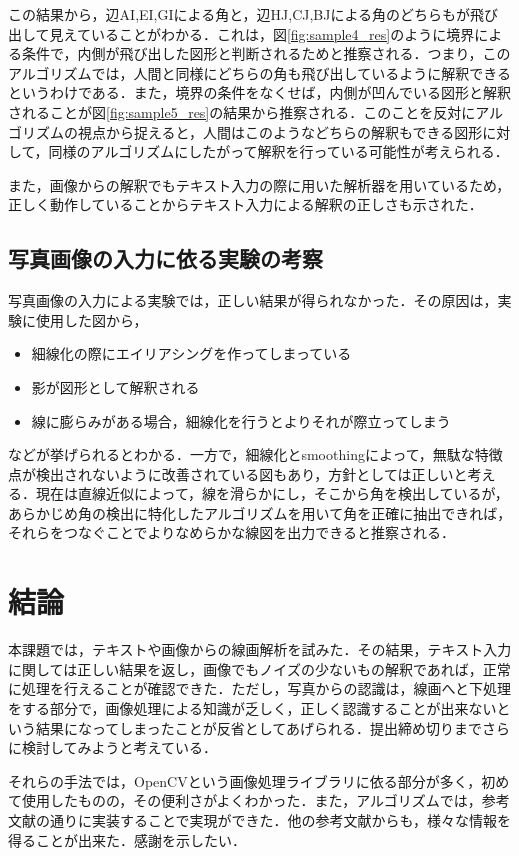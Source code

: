 \documentclass{jarticle}
\begin{document}
この結果から，辺AI,EI,GIによる角と，辺HJ,CJ,BJによる角のどちらもが飛び出して見えていることがわかる．これは，図\ref{fig:sample4_res}のように境界による条件で，内側が飛び出した図形と判断されるためと推察される．つまり，このアルゴリズムでは，人間と同様にどちらの角も飛び出しているように解釈できるというわけである．また，境界の条件をなくせば，内側が凹んでいる図形と解釈されることが図\ref{fig:sample5_res}の結果から推察される．このことを反対にアルゴリズムの視点から捉えると，人間はこのようなどちらの解釈もできる図形に対して，同様のアルゴリズムにしたがって解釈を行っている可能性が考えられる．

また，画像からの解釈でもテキスト入力の際に用いた解析器を用いているため，正しく動作していることからテキスト入力による解釈の正しさも示された．



\subsection{写真画像の入力に依る実験の考察}
写真画像の入力による実験では，正しい結果が得られなかった．その原因は，実験に使用した図から，
\begin{itemize}
	\item 細線化の際にエイリアシングを作ってしまっている
	\item 影が図形として解釈される
	\item 線に膨らみがある場合，細線化を行うとよりそれが際立ってしまう
\end{itemize}
などが挙げられるとわかる．一方で，細線化とsmoothingによって，無駄な特徴点が検出されないように改善されている図もあり，方針としては正しいと考える．現在は直線近似によって，線を滑らかにし，そこから角を検出しているが，あらかじめ角の検出に特化したアルゴリズムを用いて角を正確に抽出できれば，それらをつなぐことでよりなめらかな線図を出力できると推察される．



\section{結論}
本課題では，テキストや画像からの線画解析を試みた．その結果，テキスト入力に関しては正しい結果を返し，画像でもノイズの少ないもの解釈であれば，正常に処理を行えることが確認できた．ただし，写真からの認識は，線画へと下処理をする部分で，画像処理による知識が乏しく，正しく認識することが出来ないという結果になってしまったことが反省としてあげられる．提出締め切りまでさらに検討してみようと考えている．

それらの手法では，OpenCVという画像処理ライブラリに依る部分が多く，初めて使用したものの，その便利さがよくわかった．また，アルゴリズムでは，参考文献\cite{ref:labeling}の通りに実装することで実現ができた．他の参考文献からも，様々な情報を得ることが出来た．感謝を示したい．
\end{document}
